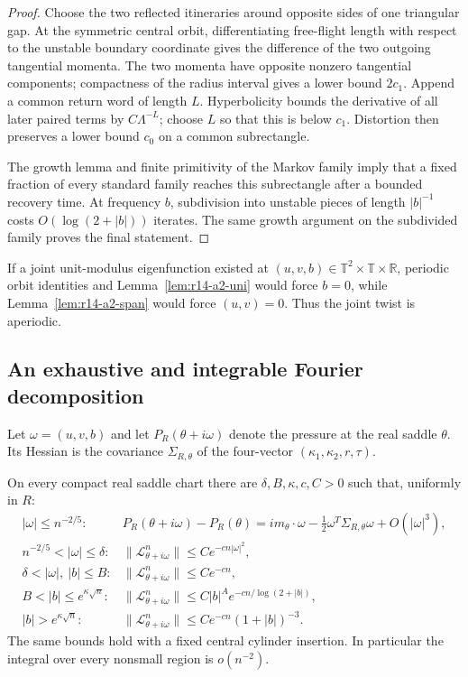 \begin{proof}
Choose the two reflected itineraries around opposite sides of one triangular
gap.  At the symmetric central orbit, differentiating free-flight length with
respect to the unstable boundary coordinate gives the difference of the two
outgoing tangential momenta.  The two momenta have opposite nonzero tangential
components; compactness of the radius interval gives a lower bound \(2c_1\).
Append a common return word of length \(L\).  Hyperbolicity bounds the
derivative of all later paired terms by \(C\Lambda^{-L}\); choose \(L\) so
that this is below \(c_1\).  Distortion then preserves a lower bound \(c_0\)
on a common subrectangle.

The growth lemma and finite primitivity of the Markov family imply that a
fixed fraction of every standard family reaches this subrectangle after a
bounded recovery time.  At frequency \(b\), subdivision into unstable pieces
of length \(|b|^{-1}\) costs \(O(\log(2+|b|))\) iterates.  The same growth
argument on the subdivided family proves the final statement.
\end{proof}

If a joint unit-modulus eigenfunction existed at
\((u,v,b)\in\mathbb T^2\times\mathbb T\times\mathbb R\), periodic orbit
identities and Lemma~\ref{lem:r14-a2-uni} would force \(b=0\), while
Lemma~\ref{lem:r14-a2-span} would force \((u,v)=0\).  Thus the joint twist is
aperiodic.

\subsection{An exhaustive and integrable Fourier decomposition}

Let \(\omega=(u,v,b)\) and let \(P_R(\theta+i\omega)\) denote the pressure at
the real saddle \(\theta\).  Its Hessian is the covariance
\(\Sigma_{R,\theta}\) of the four-vector
\((\kappa_1,\kappa_2,r,\tau)\).

\begin{theorem}
\label{thm:r14-a2-fourier}
On every compact real saddle chart there are
\(\delta,B,\kappa,c,C>0\) such that, uniformly in \(R\):
\[
\begin{array}{ll}
|\omega|\le n^{-2/5}:&
 P_R(\theta+i\omega)-P_R(\theta)
 =i m_\theta\cdot\omega
  -\tfrac12\omega^T\Sigma_{R,\theta}\omega+O(|\omega|^3),\\[1mm]
n^{-2/5}<|\omega|\le\delta:&
 \|\mathcal L_{\theta+i\omega}^n\|
 \le Ce^{-cn|\omega|^2},\\[1mm]
\delta<|\omega|,\ |b|\le B:&
 \|\mathcal L_{\theta+i\omega}^n\|\le Ce^{-cn},\\[1mm]
B<|b|\le e^{\kappa\sqrt n}:&
 \|\mathcal L_{\theta+i\omega}^n\|
 \le C|b|^A e^{-cn/\log(2+|b|)},\\[1mm]
|b|>e^{\kappa\sqrt n}:&
 \|\mathcal L_{\theta+i\omega}^n\|
 \le Ce^{-cn}(1+|b|)^{-3}.
\end{array}
\]
The same bounds hold with a fixed central cylinder insertion.  In particular
the integral over every nonsmall region is \(o(n^{-2})\).
\end{theorem}

